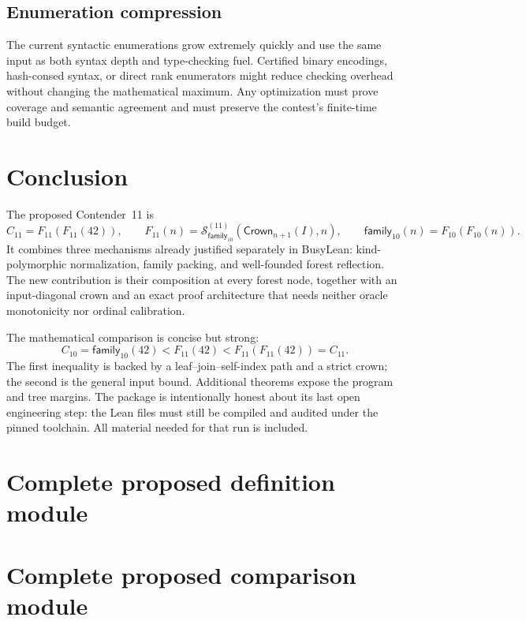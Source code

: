 \documentclass[11pt]{article}
\theoremstyle{definition}
\theoremstyle{remark}
\newcommand{\code}[1]{\texttt{#1}}
\newcommand{\Sstage}{\mathcal{S}^{(11)}}
\newcommand{\Crown}{\mathsf{Crown}}
\newcommand{\FamTen}{\mathsf{family}_{10}}
\newcommand{\Feleven}{F_{11}}
\newcommand{\ContEleven}{C_{11}}
\newcommand{\ContTen}{C_{10}}
\begin{document}
\subsection{Enumeration compression}

The current syntactic enumerations grow extremely quickly and use the same
input as both syntax depth and type-checking fuel.  Certified binary encodings,
hash-consed syntax, or direct rank enumerators might reduce checking overhead
without changing the mathematical maximum.  Any optimization must prove
coverage and semantic agreement and must preserve the contest's finite-time
build budget.

\section{Conclusion}

The proposed Contender~11 is
\[
  \boxed{\ContEleven=\Feleven(\Feleven(42))},
  \qquad
  \Feleven(n)=
  \Sstage_{\FamTen}(\Crown_{n+1}(I),n),
  \qquad
  \FamTen(n)=F_{10}(F_{10}(n)).
\]
It combines three mechanisms already justified separately in BusyLean:
kind-polymorphic normalization, family packing, and well-founded forest
reflection.  The new contribution is their composition at every forest node,
together with an input-diagonal crown and an exact proof architecture that
needs neither oracle monotonicity nor ordinal calibration.

The mathematical comparison is concise but strong:
\[
  \ContTen=\FamTen(42)
  <\Feleven(42)
  <\Feleven(\Feleven(42))=\ContEleven.
\]
The first inequality is backed by a leaf--join--self-index path and a strict
crown; the second is the general input bound.  Additional theorems expose the
program and tree margins.  The package is intentionally honest about its last
open engineering step: the Lean files must still be compiled and audited under
the pinned toolchain.  All material needed for that run is included.

\appendix
\section{Complete proposed definition module}
\label{app:def}



\section{Complete proposed comparison module}
\label{app:proof}
\end{document}
